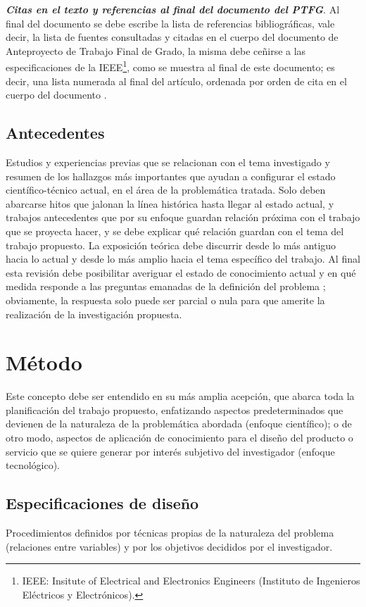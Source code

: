 \documentclass[12pt,a4paper]{article}
\begin{document}
\textbf{\textit{Citas en el texto y referencias al final del documento del PTFG}}. Al final del documento se debe escribe la lista de referencias bibliográficas, vale decir, la lista de fuentes consultadas y citadas en el cuerpo del documento de Anteproyecto de Trabajo Final de Grado, la misma debe ceñirse a las especificaciones de la IEEE\footnote{IEEE: Insitute of Electrical and Electronics Engineers (Instituto de Ingenieros Eléctricos y Electrónicos).}, como se muestra al final de este documento; es decir, una lista numerada al final del artículo, ordenada por orden de cita en el cuerpo del documento \cite{ieee}.

\subsection{Antecedentes}
Estudios y experiencias previas que se relacionan con el tema investigado y resumen de los hallazgos más importantes que ayudan a configurar el estado científico-técnico actual, en el área de la problemática tratada. Solo deben abarcarse hitos que jalonan la línea histórica hasta llegar al estado actual, y trabajos antecedentes que por su enfoque guardan relación próxima con el trabajo que se proyecta hacer, y se debe explicar qué relación guardan con el tema del trabajo propuesto. La exposición teórica debe discurrir desde lo más antiguo hacia lo actual y desde lo más amplio hacia el tema específico del trabajo. Al final esta revisión debe posibilitar averiguar el estado de conocimiento actual y en qué medida responde a las preguntas emanadas de la definición del problema \cite{sampieri}; obviamente, la respuesta solo puede ser parcial o nula para que amerite la realización de la investigación propuesta.

\section{Método}
Este concepto debe ser entendido en su más amplia acepción, que abarca toda la planificación del trabajo propuesto, enfatizando aspectos predeterminados que devienen de la naturaleza de la problemática abordada (enfoque científico); o de otro modo, aspectos de aplicación de conocimiento para el diseño del producto o servicio que se quiere generar por interés subjetivo del investigador (enfoque tecnológico).

\subsection{Especificaciones de diseño}
Procedimientos definidos por técnicas propias de la naturaleza del problema (relaciones entre variables) y por los objetivos decididos por el investigador. 
\end{document}
